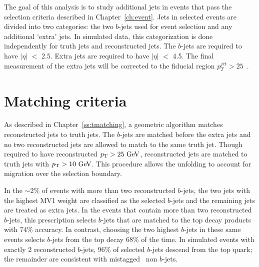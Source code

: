 
The goal of this analysis is to study additional jets in events that pass the selection criteria described in Chapter~\ref{ch:event}. 
Jets in selected events are divided into two categories: the two $b$-jets used for event selection and any additional `extra' jets. In simulated data, this categorization is done independently for truth jets and reconstructed jets. The $b$-jets are required to have $|\eta|$ $<$  2.5.  Extra jets are required to have  $|\eta|$ $<$  4.5. The final measurement of the extra jets will be corrected to the fiducial region $p_{T}^{jet} > 25$~\GeV.

\section{Matching criteria}
As described in Chapter~\ref{ss:tmatching}, a geometric algorithm matches reconstructed jets to truth jets. The $b$-jets are matched before the extra jets and no two reconstructed jets are allowed to match to the same truth jet. Though required to have reconstructed $\pt>25 \GeV$, reconstructed jets are matched to truth jets with $\pt>10 \GeV$. This procedure allows the unfolding to account for migration over the selection boundary.

In the $\sim 2\%$ of events with more than two reconstructed $b$-jets, the two jets with the highest MV1 weight are classified as the selected $b$-jets and the remaining jets are treated as extra jets. In the events that contain more than two reconstructed $b$-jets, this prescription selects $b$-jets that are matched to the top decay products with 74\% accuracy. In contrast, choosing the two highest \pt $b$-jets in these same events selects $b$-jets from the top decay 68\% of the time. In simulated events with exactly 2 reconstructed $b$-jets, 96\% of selected $b$-jets descend from the top quark; the remainder are consistent with mistagged~\cite{btagmiscal} non $b$-jets.



